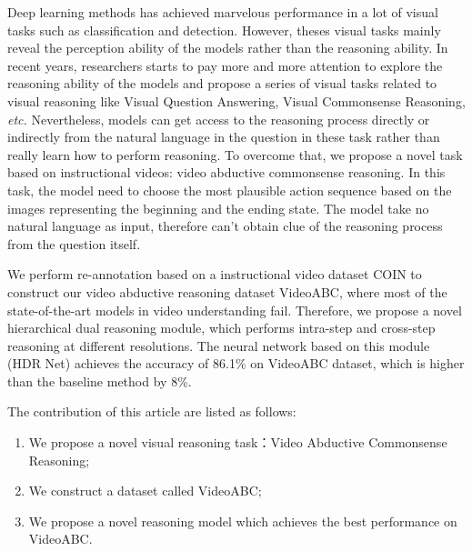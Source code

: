 \begin{abstract*}
  Deep learning methods has achieved marvelous performance in a lot of visual tasks such as classification and detection. However, theses visual tasks mainly reveal the perception ability of the models rather than the reasoning ability. In recent years, researchers starts to pay more and more attention to explore the reasoning ability of the models and propose a series of visual tasks related to visual reasoning like Visual Question Answering, Visual Commonsense Reasoning, \textit{etc.} Nevertheless, models can get access to the reasoning process directly or indirectly from the natural language in the question in these task rather than really learn how to perform reasoning. To overcome that, we propose a novel task based on instructional videos: video abductive commonsense reasoning. In this task, the model need to choose the most plausible action sequence based on the images representing the beginning and the ending state. The model take no natural language as input, therefore can't obtain clue of the reasoning process from the question itself.

  We perform re-annotation based on a instructional video dataset COIN to construct our video abductive reasoning dataset VideoABC, where most of the state-of-the-art models in video understanding fail. Therefore, we propose a novel hierarchical dual reasoning module, which performs intra-step and cross-step reasoning at different resolutions. The neural network based on this module (HDR Net) achieves the accuracy of 86.1\% on VideoABC dataset, which is higher than the baseline method by 8\%.

  The contribution of this article are listed as follows:
  \begin{enumerate}
    \item We propose a novel visual reasoning task：Video Abductive Commonsense Reasoning;
    \item We construct a dataset called VideoABC;
    \item We propose a novel reasoning model which achieves the best performance on VideoABC.
  \end{enumerate}
\end{abstract*}
